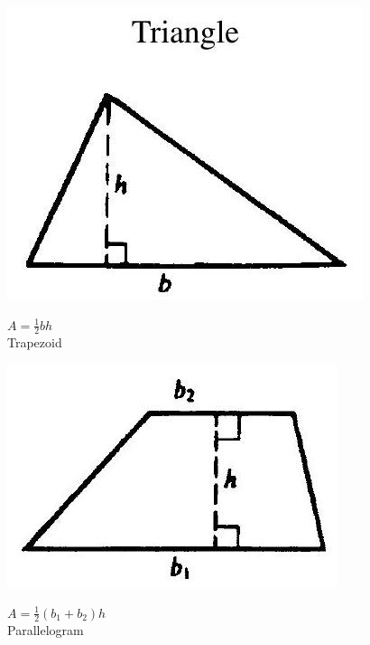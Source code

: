 \documentclass[10pt]{article}
\begin{document}
\begin{center}
\includegraphics[max width=\textwidth]{2024_04_20_fe2e8e718cc0fcd63d1bg-30(1)}
\end{center}

$A=\frac{1}{2} b h$\\
Trapezoid

\begin{center}
\includegraphics[max width=\textwidth]{2024_04_20_fe2e8e718cc0fcd63d1bg-30(4)}
\end{center}

$A=\frac{1}{2}\left(b_{1}+b_{2}\right) h$\\
Parallelogram
\end{document}
